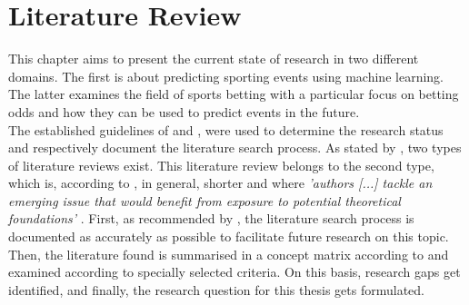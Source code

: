 \chapter{Literature Review}
This chapter aims to present the current state of research in two different domains. The first is about predicting sporting events using machine learning. The latter examines the field of sports betting with a particular focus on betting odds and how they can be used to predict events in the future. \\
The established guidelines of \cite{vom_brocke_standing_2015} and \cite{webster_guest_2002}, were used to determine the research status and respectively document the literature search process. As stated by \citeauthor{webster_guest_2002}, two types of literature reviews exist. This literature review belongs to the second type, which is, according to \citeauthor{webster_guest_2002}, in general, shorter and where \emph{'authors [...] tackle an emerging issue that would benefit from exposure to potential theoretical foundations'} \parencite[, p. 14]{webster_guest_2002}. First, as recommended by \citeauthor{vom_brocke_standing_2015}, the literature search process is documented as accurately as possible to facilitate future research on this topic. Then, the literature found is summarised in a concept matrix according to \citeauthor{webster_guest_2002} and examined according to specially selected criteria. On this basis, research gaps get identified, and finally, the research question for this thesis gets formulated.






